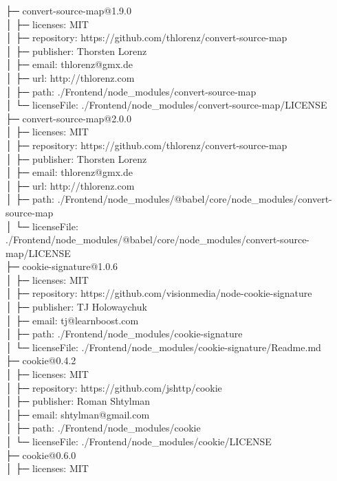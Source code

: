 ├─ convert-source-map@1.9.0\\
│  ├─ licenses: MIT\\
│  ├─ repository: https://github.com/thlorenz/convert-source-map\\
│  ├─ publisher: Thorsten Lorenz\\
│  ├─ email: thlorenz@gmx.de\\
│  ├─ url: http://thlorenz.com\\
│  ├─ path: ./Frontend/node\_modules/convert-source-map\\
│  └─ licenseFile: ./Frontend/node\_modules/convert-source-map/LICENSE\\
├─ convert-source-map@2.0.0\\
│  ├─ licenses: MIT\\
│  ├─ repository: https://github.com/thlorenz/convert-source-map\\
│  ├─ publisher: Thorsten Lorenz\\
│  ├─ email: thlorenz@gmx.de\\
│  ├─ url: http://thlorenz.com\\
│  ├─ path: ./Frontend/node\_modules/@babel/core/node\_modules/convert-source-map\\
│  └─ licenseFile: ./Frontend/node\_modules/@babel/core/node\_modules/convert-source-map/LICENSE\\
├─ cookie-signature@1.0.6\\
│  ├─ licenses: MIT\\
│  ├─ repository: https://github.com/visionmedia/node-cookie-signature\\
│  ├─ publisher: TJ Holowaychuk\\
│  ├─ email: tj@learnboost.com\\
│  ├─ path: ./Frontend/node\_modules/cookie-signature\\
│  └─ licenseFile: ./Frontend/node\_modules/cookie-signature/Readme.md\\
├─ cookie@0.4.2\\
│  ├─ licenses: MIT\\
│  ├─ repository: https://github.com/jshttp/cookie\\
│  ├─ publisher: Roman Shtylman\\
│  ├─ email: shtylman@gmail.com\\
│  ├─ path: ./Frontend/node\_modules/cookie\\
│  └─ licenseFile: ./Frontend/node\_modules/cookie/LICENSE\\
├─ cookie@0.6.0\\
│  ├─ licenses: MIT\\
